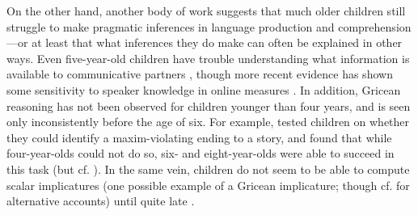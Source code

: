 \documentclass[man,noapacite]{apa2}
\begin{document}

On the other hand, another body of work suggests that much older children still struggle to make pragmatic inferences in language production and comprehension---or at least that what inferences they do make can often be explained in other ways. Even five-year-old children have trouble understanding what information is available to communicative partners \cite{glucksberg1966}, though more recent evidence has shown some sensitivity to speaker knowledge in online measures \cite{nadig2002}. In addition, Gricean reasoning has not been observed for children younger than four years, and is seen only inconsistently before the age of six. For example,  tested children on whether they could identify a maxim-violating ending to a story, and found that while four-year-olds could not do so, six- and eight-year-olds were able to succeed in this task (but cf. ). In the same vein, children do not seem to be able to compute scalar implicatures (one possible example of a Gricean implicature; though cf.  for alternative accounts) until quite late \cite{noveck2001}. 
\end{document}
